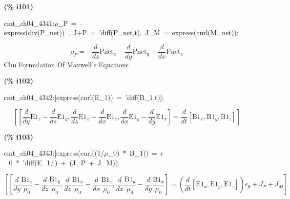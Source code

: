 \documentclass[fleqn]{article}
\begin{document}
\noindent
\begin{minipage}[t]{4.000000em}\color{red}\bfseries
(\% i101)	
\end{minipage}
\begin{minipage}[t]{\textwidth}\color{blue}
cmt\_ch04\_4341:\ensuremath{\rho}\_P\ =\ -express(div(P\_net))\ ,\ J+P\ =\ 'diff(P\_net,t),\ J\_M\ =\ express(curl(M\_net));
\end{minipage}
\[\displaystyle \tag{\% o101} 
{{\rho }_P}=-\frac{d}{d z} {{\ensuremath{\mathrm{Pnet}}}_z}-\frac{d}{d y} {{\ensuremath{\mathrm{Pnet}}}_y}-\frac{d}{d x} {{\ensuremath{\mathrm{Pnet}}}_x}\mbox{}
\]
Chu Formulation Of Maxwell's Equations


\noindent
\begin{minipage}[t]{4.000000em}\color{red}\bfseries
(\% i102)	
\end{minipage}
\begin{minipage}[t]{\textwidth}\color{blue}
cmt\_ch04\_4342:[express(curl(E\_1))\ =\ 'diff(B\_1,t)];
\end{minipage}
\[\displaystyle \tag{\% o102} 
\left[ \left[ \frac{d}{d y} {{\ensuremath{\mathrm{E1}}}_z}-\frac{d}{d z} {{\ensuremath{\mathrm{E1}}}_y}\operatorname{,}\frac{d}{d z} {{\ensuremath{\mathrm{E1}}}_x}-\frac{d}{d x} {{\ensuremath{\mathrm{E1}}}_z}\operatorname{,}\frac{d}{d x} {{\ensuremath{\mathrm{E1}}}_y}-\frac{d}{d y} {{\ensuremath{\mathrm{E1}}}_x}\right] =\frac{d}{d t} \left[ {{\ensuremath{\mathrm{B1}}}_x}\operatorname{,}{{\ensuremath{\mathrm{B1}}}_y}\operatorname{,}{{\ensuremath{\mathrm{B1}}}_z}\right] \right] \mbox{}
\]


\noindent
\begin{minipage}[t]{4.000000em}\color{red}\bfseries
(\% i103)	
\end{minipage}
\begin{minipage}[t]{\textwidth}\color{blue}
cmt\_ch04\_4343:[express(curl((1/\ensuremath{\mu}\_0)\ *\ B\_1))\ =\ \ensuremath{\epsilon}\_0\ *\ 'diff(E\_1,t)\ +\ (J\_P\ +\ J\_M)];
\end{minipage}
\[\displaystyle \tag{\% o103} 
\operatorname{[}\left[ \frac{d}{d y} \frac{{{\ensuremath{\mathrm{B1}}}_z}}{{{\mu }_0}}-\frac{d}{d z} \frac{{{\ensuremath{\mathrm{B1}}}_y}}{{{\mu }_0}}\operatorname{,}\frac{d}{d z} \frac{{{\ensuremath{\mathrm{B1}}}_x}}{{{\mu }_0}}-\frac{d}{d x} \frac{{{\ensuremath{\mathrm{B1}}}_z}}{{{\mu }_0}}\operatorname{,}\frac{d}{d x} \frac{{{\ensuremath{\mathrm{B1}}}_y}}{{{\mu }_0}}-\frac{d}{d y} \frac{{{\ensuremath{\mathrm{B1}}}_x}}{{{\mu }_0}}\right] =\left( \frac{d}{d t} \left[ {{\ensuremath{\mathrm{E1}}}_x}\operatorname{,}{{\ensuremath{\mathrm{E1}}}_y}\operatorname{,}{{\ensuremath{\mathrm{E1}}}_z}\right] \right)  {{\epsilon }_0}+{J_P}+{J_M}\operatorname{]}\mbox{}
\]
\end{document}
